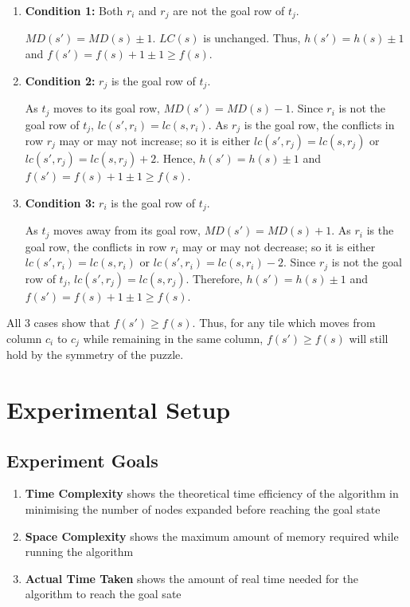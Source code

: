 \documentclass[runningheads]{llncs}
\begin{document}
\begin{enumerate}
    \item \textbf{Condition 1:} Both \( r_i \) and \( r_j \) are not the goal row of \( t_j \).
    
        \( MD(s') = MD(s) \pm 1 \). \( LC(s) \) is unchanged. Thus, \( h(s') = h(s) \pm 1 \) and \( f(s') = f(s) + 1 \pm 1 \geq f(s) \).
    
    \item \textbf{Condition 2:} \( r_j \) is the goal row of \( t_j \).
        
        As \( t_j \) moves to its goal row, \( MD(s') = MD(s) - 1 \). Since \( r_i \) is not the goal row of \( t_j \), \( lc(s', r_i) = lc(s, r_i) \). 
        As \( r_j \) is the goal row, the conflicts in row \( r_j \) may or may not increase; so it is either \( lc(s', r_j) = lc(s, r_j) \) or \( lc(s', r_j) = lc(s, r_j) + 2 \). 
        Hence, \( h(s') = h(s) \pm 1 \) and \( f(s') = f(s) + 1 \pm 1 \geq f(s) \).

    \item \textbf{Condition 3:} \( r_i \) is the goal row of \( t_j \).
    
        As \( t_j \) moves away from its goal row, \( MD(s') = MD(s) + 1 \). 
        As \( r_i \) is the goal row, the conflicts in row \( r_i \) may or may not decrease; so it is either \( lc(s', r_i) = lc(s, r_i) \) or \( lc(s', r_i) = lc(s, r_i) - 2 \). 
        Since \( r_j \) is not the goal row of \( t_j \), \( lc(s', r_j) = lc(s, r_j) \). 
        Therefore, \( h(s') = h(s) \pm 1 \) and \( f(s') = f(s) + 1 \pm 1 \geq f(s) \).
\end{enumerate}
All 3 cases show that \( f(s') \geq f(s) \). Thus, for any tile which moves from column \( c_i \) to \( c_j \) while remaining in the same column, \( f(s') \geq f(s) \) will still hold by the symmetry of the puzzle.


\section{Experimental Setup}
\subsection{Experiment Goals}
\begin{enumerate}
    \item \textbf{Time Complexity} shows the theoretical time efficiency of the algorithm in minimising the number of nodes expanded before reaching the goal state
    \item \textbf{Space Complexity} shows the maximum amount of memory required while running the algorithm
    \item \textbf{Actual Time Taken} shows the amount of real time needed for the algorithm to reach the goal sate
\end{enumerate}
\end{document}
